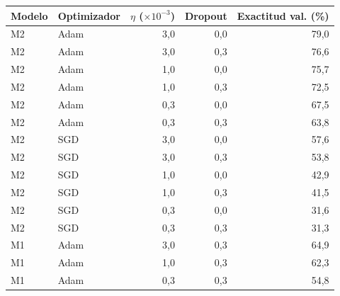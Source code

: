 \begin{tabular}{llrrr}
\toprule
Modelo & Optimizador & $\eta$ ($\times 10^{-3}$) & Dropout & Exactitud val. (\%) \\
\midrule
M2 & Adam & 3,0 & 0,0 & 79,0 \\
M2 & Adam & 3,0 & 0,3 & 76,6 \\
M2 & Adam & 1,0 & 0,0 & 75,7 \\
M2 & Adam & 1,0 & 0,3 & 72,5 \\
M2 & Adam & 0,3 & 0,0 & 67,5 \\
M2 & Adam & 0,3 & 0,3 & 63,8 \\
M2 & SGD & 3,0 & 0,0 & 57,6 \\
M2 & SGD & 3,0 & 0,3 & 53,8 \\
M2 & SGD & 1,0 & 0,0 & 42,9 \\
M2 & SGD & 1,0 & 0,3 & 41,5 \\
M2 & SGD & 0,3 & 0,0 & 31,6 \\
M2 & SGD & 0,3 & 0,3 & 31,3 \\
M1 & Adam & 3,0 & 0,3 & 64,9 \\
M1 & Adam & 1,0 & 0,3 & 62,3 \\
M1 & Adam & 0,3 & 0,3 & 54,8 \\
\bottomrule
\end{tabular}
